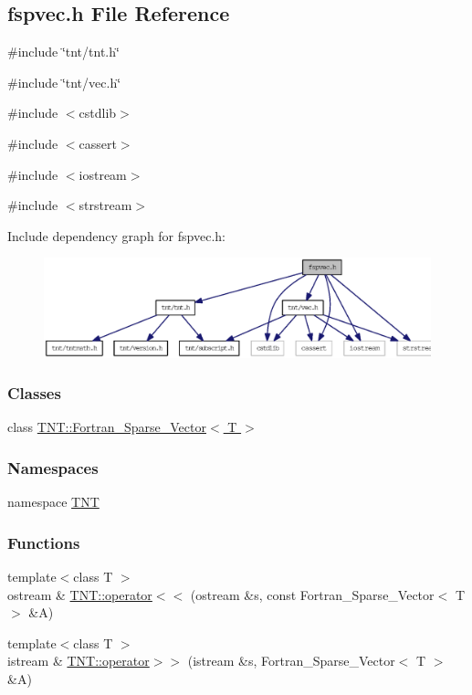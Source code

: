 \subsection{fspvec.h File Reference}
\label{fspvec_8h}
{\ttfamily \#include \char`\"{}tnt/tnt.h\char`\"{}}\par
{\ttfamily \#include \char`\"{}tnt/vec.h\char`\"{}}\par
{\ttfamily \#include $<$cstdlib$>$}\par
{\ttfamily \#include $<$cassert$>$}\par
{\ttfamily \#include $<$iostream$>$}\par
{\ttfamily \#include $<$strstream$>$}\par
Include dependency graph for fspvec.h:
\nopagebreak
\begin{figure}[H]
\begin{center}
\leavevmode
\includegraphics[width=400pt]{fspvec_8h__incl}
\end{center}
\end{figure}
\subsubsection*{Classes}
\begin{DoxyCompactItemize}
\item 
class \hyperlink{class_t_n_t_1_1_fortran___sparse___vector}{TNT::Fortran\_\-Sparse\_\-Vector$<$ T $>$}
\end{DoxyCompactItemize}
\subsubsection*{Namespaces}
\begin{DoxyCompactItemize}
\item 
namespace \hyperlink{namespace_t_n_t}{TNT}
\end{DoxyCompactItemize}
\subsubsection*{Functions}
\begin{DoxyCompactItemize}
\item 
{\footnotesize template$<$class T $>$ }\\ostream \& \hyperlink{namespace_t_n_t_a88482da0390ee1f30e10c427bebc365a}{TNT::operator$<$$<$} (ostream \&s, const Fortran\_\-Sparse\_\-Vector$<$ T $>$ \&A)
\item 
{\footnotesize template$<$class T $>$ }\\istream \& \hyperlink{namespace_t_n_t_a9de7ed1e5e9ece787ad2681d7f51097a}{TNT::operator$>$$>$} (istream \&s, Fortran\_\-Sparse\_\-Vector$<$ T $>$ \&A)
\end{DoxyCompactItemize}
